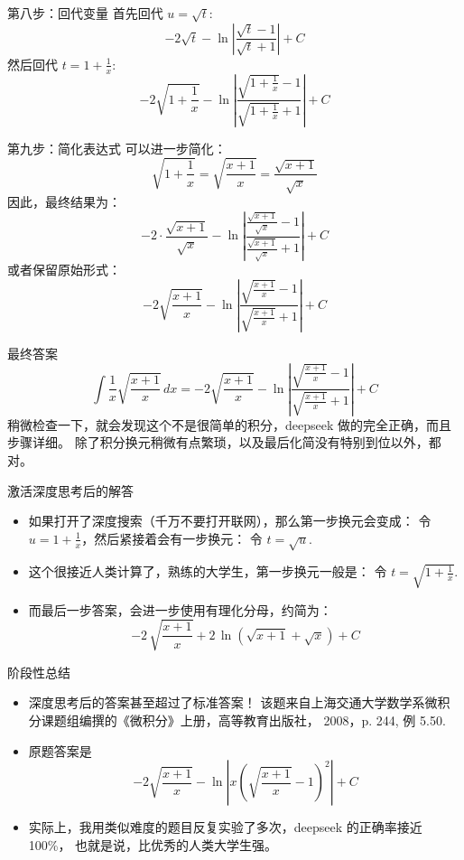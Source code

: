 \documentclass{beamer}
\begin{document}
\begin{frame}{第八步：回代变量}
首先回代 $u = \sqrt{t}$:
$$
-2\sqrt{t} - \ln \left| \frac{\sqrt{t} - 1}{\sqrt{t} + 1} \right| + C
$$
然后回代 $t = 1 + \frac{1}{x}$:
$$
-2\sqrt{1 + \frac{1}{x}} 
- \ln \left| \frac{\sqrt{1 + \frac{1}{x}} - 1}{\sqrt{1 + \frac{1}{x}} + 1} \right| + C
$$
\end{frame}

\begin{frame}{第九步：简化表达式}
可以进一步简化：
$$
\sqrt{1 + \frac{1}{x}} = \sqrt{\frac{x + 1}{x}} = \frac{\sqrt{x + 1}}{\sqrt{x}}
$$
因此，最终结果为：
$$
-2 \cdot \frac{\sqrt{x + 1}}{\sqrt{x}} 
- \ln \left| \frac{\frac{\sqrt{x + 1}}{\sqrt{x}} - 1}{\frac{\sqrt{x + 1}}{\sqrt{x}} + 1} \right| + C
$$
或者保留原始形式：
$$
-2 \sqrt{\frac{x + 1}{x}} 
- \ln \left| \frac{\sqrt{\frac{x + 1}{x}} - 1}{\sqrt{\frac{x + 1}{x}} + 1} \right| + C
$$
\end{frame}

\begin{frame}{最终答案}
$$
\int \frac{1}{x} \sqrt{\frac{x + 1}{x}} \, dx 
= \boxed{ -2 \sqrt{\frac{x + 1}{x}} 
- \ln \left| \frac{\sqrt{\frac{x + 1}{x}} - 1}{\sqrt{\frac{x + 1}{x}} + 1} \right| + C }
$$
稍微检查一下，就会发现这个不是很简单的积分，deepseek 做的完全正确，而且步骤详细。
除了积分换元稍微有点繁琐，以及最后化简没有特别到位以外，都对。
\end{frame}

\begin{frame}{激活深度思考后的解答}
\begin{itemize}
  \item<1-> 如果打开了深度搜索（千万不要打开联网），那么第一步换元会变成：
令 $u = 1 + \frac{1}{x}$，然后紧接着会有一步换元：
令 $t = \sqrt{u}$.
  \item<2-> 这个很接近人类计算了，熟练的大学生，第一步换元一般是：
令 $t = \sqrt{1 + \frac{1}{x}}$.
  \item<3-> 而最后一步答案，会进一步使用有理化分母，约简为：
$$
\boxed{-2\,\sqrt{\dfrac{x+1}{x}} + 2\,\ln \left(\sqrt{x+1} + \sqrt{x}\right) + C}
$$
\end{itemize}
\end{frame}

\begin{frame}{阶段性总结}
\begin{itemize}
  \item<1-> 深度思考后的答案甚至超过了标准答案！
  该题来自上海交通大学数学系微积分课题组编撰的《微积分》上册，高等教育出版社，
  2008，p. 244, 例 5.50.
  \item<2-> 原题答案是
$$
\boxed{-2\sqrt{\dfrac{x+1}{x}} 
- \ln \left|x\left(\sqrt{\frac{x+1}{x}} - 1\right)^2\right| + C}
$$
  \item<3-> 实际上，我用类似难度的题目反复实验了多次，deepseek 的正确率接近 100\%，
  也就是说，比优秀的人类大学生强。

\end{itemize}
\end{frame}
\end{document}
